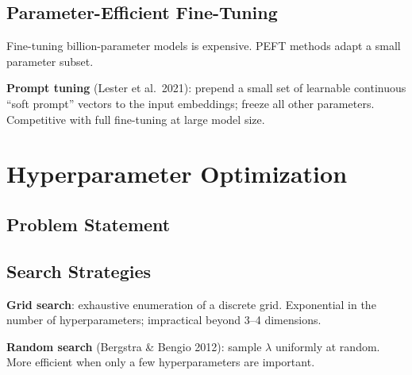 \documentclass[oneside]{book}
\begin{document}
\section{Parameter-Efficient Fine-Tuning}

Fine-tuning billion-parameter models is expensive.  PEFT methods adapt a
small parameter subset.


\textbf{Prompt tuning} (Lester et al.\ 2021): prepend a small set of
learnable continuous ``soft prompt'' vectors to the input embeddings; freeze
all other parameters.  Competitive with full fine-tuning at large model size.

\chapter{Hyperparameter Optimization}

\section{Problem Statement}


\section{Search Strategies}

\textbf{Grid search}: exhaustive enumeration of a discrete grid.  Exponential
in the number of hyperparameters; impractical beyond 3--4 dimensions.

\textbf{Random search} (Bergstra \& Bengio 2012): sample $\lambda$ uniformly
at random.  More efficient when only a few hyperparameters are important.
\end{document}

